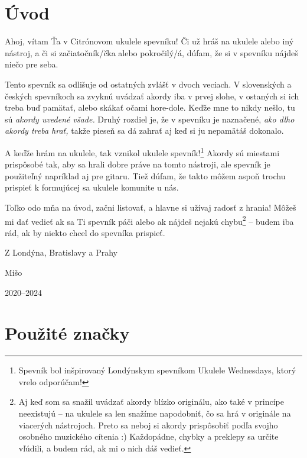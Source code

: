 \begingroup %
\setlength{\parindent}{0pt}
\setlength{\parskip}{\baselineskip}
\def\arraystretch{1.7}%
\setlength{\arrayrulewidth}{0.3mm}
\large

\section*{Úvod}

Ahoj, vítam Ťa v Citrónovom ukulele spevníku! Či už hráš na ukulele alebo iný nástroj,
a či si začiatočník/čka alebo pokročilý/á, dúfam, že si v spevníku nájdeš niečo pre seba.

Tento spevník sa odlišuje od ostatných zvlášť v dvoch veciach. V slovenských a českých
spevníkoch sa zvyknú uvádzať akordy iba v prvej slohe, v ostaných si ich treba buď
pamätať, alebo skákať očami hore-dole. Keďže mne to nikdy nešlo, tu sú
\emph{akordy uvedené všade.} Druhý rozdiel je, že v spevníku je naznačené,
\emph{ako dlho akordy treba hrať,} takže pieseň sa dá zahrať aj keď si ju
nepamätáš dokonalo.

A keďže hrám na ukulele, tak vznikol ukulele spevník!\footnote{Spevník bol inšpirovaný
Londýnskym spevníkom Ukulele Wednesdays, ktorý vrelo odporúčam!} Akordy sú miestami
prispôsobé tak, aby sa hrali dobre práve na tomto nástroji, ale spevník je použiteľný
napríklad aj pre gitaru. Tiež dúfam, že takto môžem aspoň trochu prispieť k formujúcej
sa ukulele komunite u nás.

Toľko odo mňa na úvod, začni listovať, a hlavne si užívaj radosť z hrania! Môžeš
mi dať vedieť ak sa Ti spevník páči alebo ak nájdeš nejakú chybu\footnote{
Aj keď som sa snažil uvádzať akordy blízko originálu,  ako také
v princípe neexistujú -- na ukulele sa len snažíme napodobniť, čo sa hrá v originále
na viacerých nástrojoch. Preto sa neboj si akordy prispôsobiť podľa svojho osobného
muzického cítenia :) Každopádne, chybky a preklepy sa určite vľúdili, a budem rád,
ak mi o nich dáš vedieť.
}
-- budem iba rád,
ak by niekto chcel do spevníka prispieť.

Z Londýna, Bratislavy a Prahy

{
\hspace{1cm}
Mišo

\vspace{-0.3cm}
\hspace{1cm}
2020--2024
}

\newpage
\section*{Použité značky}

